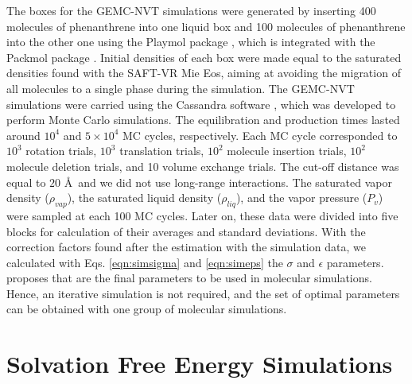 The boxes for the GEMC-NVT simulations were generated by inserting 400 molecules of phenanthrene into one liquid box and 100 molecules of phenanthrene into the other one using the Playmol package \cite{playmol}, which is integrated with the Packmol package \cite{packmol}. Initial densities of each box were made equal to the saturated densities found with the SAFT-VR Mie Eos, aiming at avoiding the migration of all molecules to a single phase during the simulation. The GEMC-NVT simulations were carried using the Cassandra software \cite{doi:10.1063/1.3644939},  which was developed to perform Monte Carlo simulations. The equilibration and production times lasted around  $10^{4}$ and $5 \times 10^{4}$ MC cycles, respectively. Each MC cycle corresponded to $10^3$ rotation trials, $10^3$ translation trials, $10^2$ molecule insertion trials, $10^2$ molecule deletion trials, and 10 volume exchange trials. The cut-off distance was equal to $20$ \AA  $\,$ and we did not use long-range interactions. The saturated vapor density ($\rho_{vap}$), the saturated liquid density ($\rho_{liq}$), and the vapor pressure ($P_{v}$) were sampled at each 100 MC cycles. Later on, these data were divided into five blocks for calculation of their averages and standard deviations. With the correction factors found after the estimation with the simulation data, we calculated with Eqs. \eqref{eqn:simsigma} and \eqref{eqn:simeps} the $\sigma$ and $\epsilon$ parameters.  proposes that are the final parameters to be used in molecular simulations. Hence, an iterative simulation is not required, and the set of optimal parameters can be obtained with one group of molecular simulations. 

\section{Solvation Free Energy Simulations}\label{solvme}

